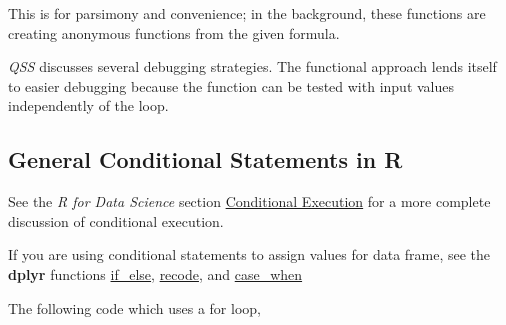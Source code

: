 \documentclass[]{book}
\newenvironment{Shaded}{\begin{snugshade}}{\end{snugshade}}
\newcommand{\CharTok}[1]{\textcolor[rgb]{0.31,0.60,0.02}{#1}}
\newcommand{\CommentTok}[1]{\textcolor[rgb]{0.56,0.35,0.01}{\textit{#1}}}
\newcommand{\ControlFlowTok}[1]{\textcolor[rgb]{0.13,0.29,0.53}{\textbf{#1}}}
\newcommand{\DecValTok}[1]{\textcolor[rgb]{0.00,0.00,0.81}{#1}}
\newcommand{\KeywordTok}[1]{\textcolor[rgb]{0.13,0.29,0.53}{\textbf{#1}}}
\newcommand{\NormalTok}[1]{#1}
\newcommand{\OperatorTok}[1]{\textcolor[rgb]{0.81,0.36,0.00}{\textbf{#1}}}
\newcommand{\OtherTok}[1]{\textcolor[rgb]{0.56,0.35,0.01}{#1}}
\newcommand{\StringTok}[1]{\textcolor[rgb]{0.31,0.60,0.02}{#1}}
\theoremstyle{definition}
\theoremstyle{definition}
\theoremstyle{definition}
\theoremstyle{remark}
\begin{document}
This is for parsimony and convenience; in the background, these
functions are creating anonymous functions from the given formula.

\emph{QSS} discusses several debugging strategies. The functional
approach lends itself to easier debugging because the function can be
tested with input values independently of the loop.

\hypertarget{general-conditional-statements-in-r}{%
\subsection{General Conditional Statements in
R}\label{general-conditional-statements-in-r}}

See the \emph{R for Data Science} section
\href{http://r4ds.had.co.nz/functions.html\#conditional-execution}{Conditional
Execution} for a more complete discussion of conditional execution.

If you are using conditional statements to assign values for data frame,
see the \textbf{dplyr} functions
\href{https://www.rdocumentation.org/packages/dplyr/topics/if_else}{if\_else},
\href{https://www.rdocumentation.org/packages/dplyr/topics/recode}{recode},
and
\href{https://www.rdocumentation.org/packages/dplyr/topics/case_when}{case\_when}

The following code which uses a for loop,

\begin{Shaded}
\end{Shaded}
\end{document}
